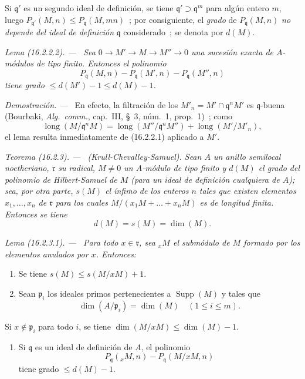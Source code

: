 \documentclass[10pt,oneside]{book}
\makeatletter
\newcommand{\setmanualcurrentlabel}[1]{\def\@currentlabel{#1}}
\newenvironment{theorem}[1][]{%
  \setmanualcurrentlabel{#1}\par\medskip\noindent\itshape Teorema (#1). ---\ }{\par}
\newenvironment{lemma}[1][]{%
  \setmanualcurrentlabel{#1}\par\medskip\noindent\itshape Lema (#1). ---\ }{\par}
\newenvironment{proof}{%
  \par\medskip\noindent\textit{Demostración. ---\ }}{\par}
\providecommand{\setmin}{-}%
\makeatother
\begin{document}
Si $\mathfrak{q}'$ es un segundo ideal de definición, se tiene
$\mathfrak{q}'\supset\mathfrak{q}^m$ para algún entero $m$, luego
$P_{\mathfrak{q}'}(M,n)\leq P_{\mathfrak{q}}(M,mn)$~; por consiguiente, el
\emph{grado} de $P_{\mathfrak{q}}(M,n)$ \emph{no depende del ideal de definición}
$\mathfrak{q}$ considerado~; se denota por $d(M)$.

\begin{lemma}[16.2.2.2]
\label{0.16.2.2.2-es}
Sea $0\to M'\to M\to M''\to0$ una sucesión exacta de $A$-módulos de tipo
finito. Entonces el polinomio
\[
  P_{\mathfrak{q}}(M,n)\setmin P_{\mathfrak{q}}(M',n)
  \setmin P_{\mathfrak{q}}(M'',n)
\]
tiene grado $\leq d(M')\setmin 1\leq d(M)\setmin 1$.
\end{lemma}

\begin{proof}
En efecto, la filtración de los
$M'_n=M'\cap\mathfrak{q}^nM'$ es $\mathfrak{q}$-buena (Bourbaki,
\emph{Alg.~comm.}, cap.~III, \S~3, núm.~1, prop.~1)~; como
\[
  \operatorname{long}(M/\mathfrak{q}^nM)
  =\operatorname{long}(M''/\mathfrak{q}^nM'')
  +\operatorname{long}(M'/M'_n),
\]
el lema resulta inmediatamente de (16.2.2.1) aplicado a $M'$.
\end{proof}

\begin{theorem}[16.2.3]
\label{0.16.2.3-es}
\textup{(Krull-Chevalley-Samuel).}
Sean $A$ un anillo semilocal noetheriano, $\mathfrak{r}$ su radical,
$M\neq0$ un $A$-módulo de tipo finito y $d(M)$ el grado del polinomio de
Hilbert-Samuel de $M$ (para un ideal de definición cualquiera de $A$); sea,
por otra parte, $s(M)$ el ínfimo de los enteros $n$ tales que existen elementos
$x_1,\ldots,x_n$ de $\mathfrak{r}$ para los cuales
$M/(x_1M+\ldots+x_nM)$ es de longitud finita. Entonces se tiene
\[
  d(M)=s(M)=\dim(M).
\]
\end{theorem}

\begin{lemma}[16.2.3.1]
\label{0.16.2.3.1-es}
Para todo $x\in\mathfrak{r}$, sea ${}_xM$ el submódulo de $M$ formado por los
elementos anulados por $x$. Entonces:
\begin{enumerate}
  \item[\rm{(i)}] Se tiene $s(M)\leq s(M/xM)+1$.
  \item[\rm{(ii)}] Sean $\mathfrak{p}_i$ los ideales primos pertenecientes a
  $\operatorname{Supp}(M)$ y tales que
  \[
    \dim(A/\mathfrak{p}_i)=\dim(M)\quad(1\leq i\leq m).
  \]
\end{enumerate}
Si $x\notin\mathfrak{p}_i$ para todo $i$, se tiene
$\dim(M/xM)\leq\dim(M)\setmin 1$.
\begin{enumerate}
  \item[\rm{(iii)}] Si $\mathfrak{q}$ es un ideal de definición de $A$, el
  polinomio
  \[
    P_{\mathfrak{q}}({}_xM,n)\setmin P_{\mathfrak{q}}(M/xM,n)
  \]
  tiene grado $\leq d(M)\setmin 1$.
\end{enumerate}
\end{lemma}
\end{document}
